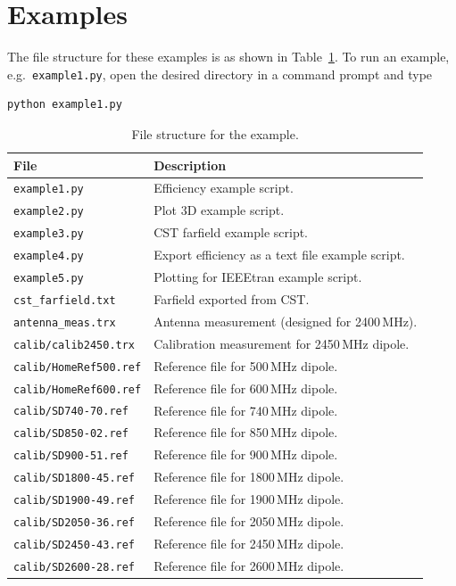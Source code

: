 \documentclass[10pt]{article}
\begin{document}
\section{Examples}
The file structure for these examples is as shown in Table~\ref{tab:example}. To run an example, e.g.\ \texttt{example1.py}, open the desired directory in a command prompt and type 
\begin{verbatim}
python example1.py
\end{verbatim}
\begin{table}[htbp]
    \centering
    \begin{tabular}{|l|l|}
        \hline
        File & Description \\
        \hline
        \texttt{example1.py}          & Efficiency example script. \\
        \texttt{example2.py}          & Plot 3D example script. \\
        \texttt{example3.py}          & CST farfield example script. \\
        \texttt{example4.py}          & Export efficiency as a text file example script. \\
        \texttt{example5.py}          & Plotting for IEEEtran example script.  \\
        \hline
        \texttt{cst\_farfield.txt}    & Farfield exported from CST. \\
        \texttt{antenna\_meas.trx}    & Antenna measurement (designed for 2400\,MHz). \\
        \hline
        \texttt{calib/calib2450.trx}  & Calibration measurement for 2450\,MHz dipole. \\
        \hline
        \texttt{calib/HomeRef500.ref} & Reference file for 500\,MHz dipole. \\
        \texttt{calib/HomeRef600.ref} & Reference file for 600\,MHz dipole. \\
        \texttt{calib/SD740-70.ref}   & Reference file for 740\,MHz dipole. \\
        \texttt{calib/SD850-02.ref}   & Reference file for 850\,MHz dipole. \\
        \texttt{calib/SD900-51.ref}   & Reference file for 900\,MHz dipole. \\
        \texttt{calib/SD1800-45.ref}  & Reference file for 1800\,MHz dipole. \\
        \texttt{calib/SD1900-49.ref}  & Reference file for 1900\,MHz dipole. \\
        \texttt{calib/SD2050-36.ref}  & Reference file for 2050\,MHz dipole. \\
        \texttt{calib/SD2450-43.ref}  & Reference file for 2450\,MHz dipole. \\
        \texttt{calib/SD2600-28.ref}  & Reference file for 2600\,MHz dipole. \\
        \hline
    \end{tabular}
    \caption{File structure for the example.}
    \label{tab:example}
\end{table}
\end{document}
